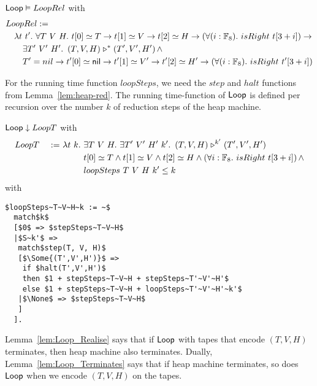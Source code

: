 \begin{lemma}
  \label{lem:Loop_Realise}
  $\mathsf{Loop} \mathrel{\vDash} LoopRel$ with
  \begin{alignat*}{1}
    & LoopRel := \\
    &\quad \lambda t~t'.~\forall T~V~H.~ t[0] \simeq T \rightarrow t[1] \simeq V \rightarrow t[2] \simeq H \rightarrow \left(\forall (i:\mathbb{F}_8).~isRight~t[3+i]\right) \rightarrow \\
    &\qquad \exists T'~V'~H'.~ \left(T,V,H\right) \mathrel{\triangleright}^* \left(T',V',H'\right) \land \\ 
    &\qquad T' = nil \rightarrow t'[0] \simeq \mathsf{nil} \rightarrow t'[1] \simeq V' \rightarrow t'[2] \simeq H' \rightarrow \left(\forall (i:\mathbb{F}_8).~isRight~t'[3+i]\right)
  \end{alignat*}
\end{lemma}

For the running time function $loopSteps$, we need the $step$ and $halt$ functions from Lemma~\ref{lem:heap-red}.  The running time-function of $\mathsf{Loop}$ is
defined per recursion over the number $k$ of reduction steps of the heap machine.
\begin{lemma}
  \label{lem:Loop_Terminates}
  $\mathsf{Loop} \mathrel{\downarrow} LoopT$ with
  \begin{alignat*}{2}
    &LoopT &~:=~& \lambda t~k.~\exists T~V~H.~\exists T'~V'~H'~k'.~ \left(T,V,H\right) \mathrel{\triangleright}^{k'} \left(T',V',H'\right) \\
    &      &    & \phantom{\lambda t~k.}~t[0] \simeq T \land t[1] \simeq V \land t[2] \simeq H \land \left(\forall i:\mathbb{F}_8.~isRight~t[3+i]\right) \land \\
    &      &    & \phantom{\lambda t~k.}~loopSteps~T~V~H~k' \leq k
  \end{alignat*}
  with
  \small
\begin{lstlisting}[style=semicoqstyle]
$loopSteps~T~V~H~k := ~$
  match$k$
  [$0$ => $stepSteps~T~V~H$
  |$S~k'$ =>
   match$step(T, V, H)$
   [$\Some{(T',V',H')}$ =>
    if $halt(T',V',H')$
    then $1 + stepSteps~T~V~H + stepSteps~T'~V'~H'$
    else $1 + stepSteps~T~V~H + loopSteps~T'~V'~H'~k'$
   |$\None$ => $stepSteps~T~V~H$
   ]
  ].
\end{lstlisting}
\end{lemma}

Lemma~\ref{lem:Loop_Realise} says that if $\mathsf{Loop}$ with tapes that encode $(T,V,H)$ terminates, then heap machine also terminates.  Dually,
Lemma~\ref{lem:Loop_Terminates} says that if heap machine terminates, so does $\mathsf{Loop}$ when we encode $(T,V,H)$ on the tapes.

